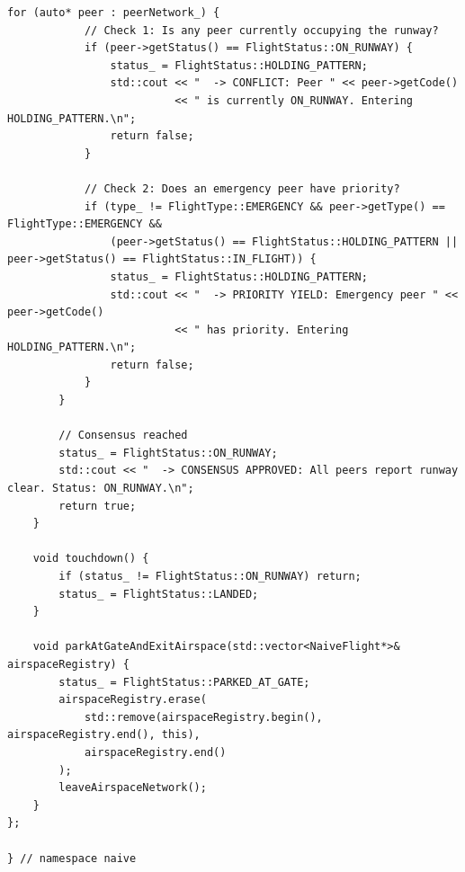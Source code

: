 \documentclass[12pt,a4paper]{article}
\begin{document}
\begin{lstlisting}[caption={Naive Flight Coordination with Direct Peer Mesh (\texttt{naive.cpp})}]
        for (auto* peer : peerNetwork_) {
            // Check 1: Is any peer currently occupying the runway?
            if (peer->getStatus() == FlightStatus::ON_RUNWAY) {
                status_ = FlightStatus::HOLDING_PATTERN;
                std::cout << "  -> CONFLICT: Peer " << peer->getCode() 
                          << " is currently ON_RUNWAY. Entering HOLDING_PATTERN.\n";
                return false;
            }

            // Check 2: Does an emergency peer have priority?
            if (type_ != FlightType::EMERGENCY && peer->getType() == FlightType::EMERGENCY &&
                (peer->getStatus() == FlightStatus::HOLDING_PATTERN || peer->getStatus() == FlightStatus::IN_FLIGHT)) {
                status_ = FlightStatus::HOLDING_PATTERN;
                std::cout << "  -> PRIORITY YIELD: Emergency peer " << peer->getCode() 
                          << " has priority. Entering HOLDING_PATTERN.\n";
                return false;
            }
        }

        // Consensus reached
        status_ = FlightStatus::ON_RUNWAY;
        std::cout << "  -> CONSENSUS APPROVED: All peers report runway clear. Status: ON_RUNWAY.\n";
        return true;
    }

    void touchdown() {
        if (status_ != FlightStatus::ON_RUNWAY) return;
        status_ = FlightStatus::LANDED;
    }

    void parkAtGateAndExitAirspace(std::vector<NaiveFlight*>& airspaceRegistry) {
        status_ = FlightStatus::PARKED_AT_GATE;
        airspaceRegistry.erase(
            std::remove(airspaceRegistry.begin(), airspaceRegistry.end(), this),
            airspaceRegistry.end()
        );
        leaveAirspaceNetwork();
    }
};

} // namespace naive
\end{lstlisting}
\end{document}
